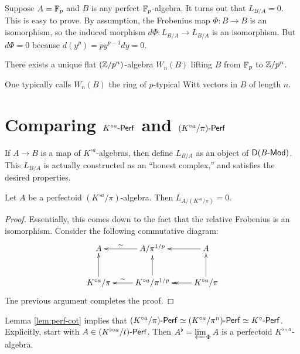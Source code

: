 \documentclass{article}
\begin{document}
\begin{example}
Suppose $A=\mathbb{F}_p$ and $B$ is any perfect $\mathbb{F}_p$-algebra. It turns out that 
$L_{B/A}=0$. This is easy to prove. By assumption, the Frobenius map 
$\Phi:B\to B$ is an isomorphism, so the induced morphism 
$d\Phi:L_{B/A} \to L_{B/A}$ is an isomorphism. But $d\Phi=0$ because 
$d(y^p) = p y^{p-1} d y = 0$. 
\end{example}

\begin{corollary}
There exists a unique flat $(\mathbb{Z}/p^n)$-algebra $W_n(B)$ lifting $B$ from 
$\mathbb{F}_p$ to $\mathbb{Z}/p^n$. 
\end{corollary}

One typically calls $W_n(B)$ the ring of $p$-typical Witt vectors in $B$ 
of length $n$. 





\section{Comparing $K^{\circ a}\textnormal{-}\mathsf{Perf}$ and $(K^{\circ a}/\pi)\textnormal{-}\mathsf{Perf}$}

If $A\to B$ is a map of $K^{\circ a}$-algebras, then \cite{gr03} define 
$L_{B/A}$ as an object of $\mathsf D(B\textnormal{-}\mathsf{Mod})$. This $L_{B/A}$ is actually 
constructed as an ``honest complex,'' and satisfies the desired properties. 

\begin{lemma}\label{lem:perf-cot}
Let $A$ be a perfectoid $(K^{\circ a}/\pi)$-algebra. Then 
$L_{A/(K^{\circ a}/\pi)}=0$. 
\end{lemma}
\begin{proof}
Essentially, this comes down to the fact that the relative Frobenius is an 
isomorphism. Consider the following commutative diagram:
\[\xymatrix{
  A 
    & A/\pi^{1/p} \ar[l]_-\sim
    & A \ar[l] \\
  K^{\circ a}/\pi \ar[u] 
    & K^{\circ a}/\pi^{1/p} \ar[l]_-\sim \ar[u] 
    & K^{\circ a}/\pi \ar[u] \ar@{->>}[l] 
}\]
Tne previous argument completes the proof. 
\end{proof}

Lemma \ref{lem:perf-cot} implies that 
$(K^{\circ a}/\pi)\textnormal{-}\mathsf{Perf} \simeq (K^{\circ a}/\pi^n)\textnormal{-}\mathsf{Perf} \simeq K^{\circ }\textnormal{-}\mathsf{Perf}$. 
Explicitly, start with $A\in (K^{\flat \circ a}/t)\textnormal{-}\mathsf{Perf}$. Then 
$A^\flat = \varprojlim_\Phi A$ is a perfectoid $K^{\flat\circ a}$-algebra. 
\end{document}
